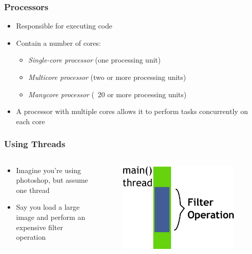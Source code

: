 \documentclass{beamer}
\newcommand{\linespace}{\vskip 0.25cm}
\begin{document}
\begin{frame}
\frametitle{Processors}
	\begin{itemize}
	\item Responsible for executing code
	\linespace
	\item Contain a number of cores:
	\begin{itemize}
		\item \emph{Single-core processor} (one processing unit) 
		\item \emph{Multicore processor} (two or more processing units)
		\item \emph{Manycore processor} (~20 or more processing units)
	\end{itemize}
	\linespace
	\item A processor with multiple cores allows it to perform tasks concurrently on each core
	\end{itemize}
\end{frame}

\begin{frame}
\frametitle{Using Threads}

\begin{columns}
	\begin{column}{0.5\textwidth}
		\linespace
		\begin{itemize}
		\item Imagine you're using photoshop, but assume one thread
		\item Say you load a large image and perform an expensive filter operation
		\end{itemize}
		\end{column}
	\begin{column}{0.5\textwidth}
		\begin{figure}
		\includegraphics[width=0.95\textwidth]{Illustrations/ThreadExample_GUI_Part1}
		\label{fig:single_photoshop}
		\end{figure}
	\end{column}
\end{columns}

\end{frame}
\end{document}
